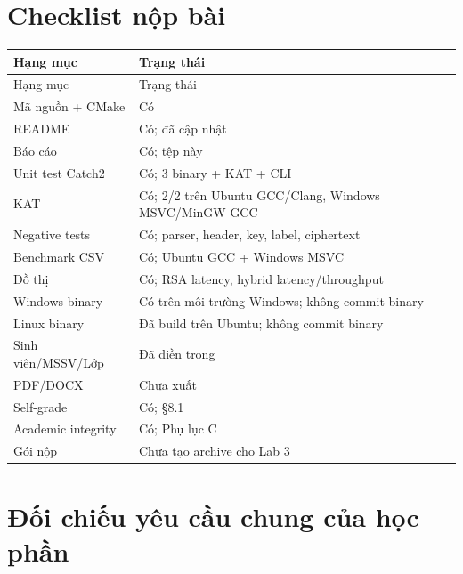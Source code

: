 \documentclass[12pt,a4paper,oneside]{report}
\let\origtexttt\texttt
\renewcommand{\texttt}[1]{\origtexttt{\seqsplit{#1}}}
\begin{document}
\section{Checklist nộp bài}


\begin{longtable}{p{}p{}}
\toprule
Hạng mục & Trạng thái \\
\midrule
\endfirsthead
\toprule
Hạng mục & Trạng thái \\
\midrule
\endhead
Mã nguồn + CMake & Có \\
README & Có; đã cập nhật \\
Báo cáo & Có; tệp này \\
Unit test Catch2 & Có; 3 binary + KAT + CLI \\
KAT & Có; 2/2 trên Ubuntu GCC/Clang, Windows MSVC/MinGW GCC \\
Negative tests & Có; parser, header, key, label, ciphertext \\
Benchmark CSV & Có; Ubuntu GCC + Windows MSVC \\
Đồ thị & Có; RSA latency, hybrid latency/throughput \\
Windows binary & Có trên môi trường Windows; không commit binary \\
Linux binary & Đã build trên Ubuntu; không commit binary \\
Sinh viên/MSSV/Lớp & Đã điền trong \texttt{REPORT.md} \\
PDF/DOCX & Chưa xuất \\
Self-grade & Có; §8.1 \\
Academic integrity & Có; Phụ lục C \\
Gói nộp & Chưa tạo archive cho Lab 3 \\
\bottomrule
\end{longtable}


\section{Đối chiếu yêu cầu chung của học phần}
\end{document}
